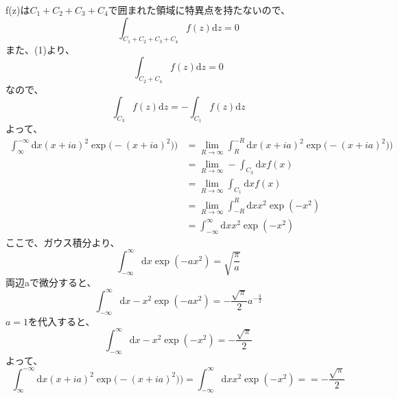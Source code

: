 \documentclass[dvipdfmx,a4paper]{jsarticle}
\begin{document}
\subsubsection{}
f(z)は$C_1+C_2+C_3+C_4$で囲まれた領域に特異点を持たないので、
$$
\int_{C_1+C_2+C_3+C_4}f(z)\mathrm{d}z = 0
$$
また、(1)より、
$$
\int_{C_2+C_4}f(z)\mathrm{d}z = 0
$$
なので、
$$
\int_{C_3}f(z)\mathrm{d}z  = - \int_{C_1}f(z)\mathrm{d}z  
$$
よって、
\begin{align*}
\int_{\infty}^{-\infty}\mathrm{d}x(x+ia)^2 \exp{\bigl(-(x+ia)^2)\bigr)} &= \lim_{R \to \infty} \int_{R}^{-R}\mathrm{d}x(x+ia)^2 \exp{\bigl(-(x+ia)^2)\bigr)}\\
&=\lim_{R \to \infty} -\int_{C_3}\mathrm{d}xf(x)\\
&=\lim_{R \to \infty} \int_{C_1}\mathrm{d}xf(x)\\
&= \lim_{R \to \infty} \int_{-R}^{R}\mathrm{d}x x^2 \exp{(-x^2)}\\
&= \int_{-\infty}^{\infty}\mathrm{d}x x^2 \exp{(-x^2)}
\end{align*}
ここで、ガウス積分より、
$$
\int_{-\infty}^{\infty}\mathrm{d}x \exp{(-ax^2)} = \sqrt{\frac{\pi}{a}}
$$
両辺aで微分すると、
$$
\int_{-\infty}^{\infty}\mathrm{d}x -x^2\exp{(-ax^2)} = -\frac{\sqrt{\pi}}{2} a^{-\frac{3}{2}}
$$
$a = 1$を代入すると、
$$
\int_{-\infty}^{\infty}\mathrm{d}x -x^2\exp{(-x^2)} = -\frac{\sqrt{\pi}}{2}
$$
よって、
$$
\int_{\infty}^{-\infty}\mathrm{d}x(x+ia)^2 \exp{\bigl(-(x+ia)^2)\bigr)} = \int_{-\infty}^{\infty}\mathrm{d}x x^2 \exp{(-x^2)} = = -\frac{\sqrt{\pi}}{2}
$$
\end{document}

